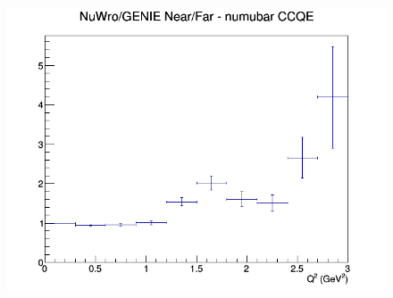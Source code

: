 \begin{figure}[h]
\endminipage
{}
\includegraphics[width=\linewidth]{eff_Q2/GAr/ratios/CCQE_NuWro_GENIE_numubar_NF_Q2.png}
\endminipage
\newline
\end{figure}
\clearpage
